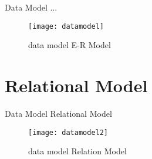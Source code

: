 \documentclass[10pt]{article}         %
\begin{document}
Data Model ...
\begin{figure}[h]
     \texttt{[image: datamodel]}
     \caption{data model E-R Model}
\end{figure}

\section{Relational Model}
Data Model  Relational Model

 \begin{figure}[h]
     \texttt{[image: datamodel2]}
     \caption{data model Relation Model}
\end{figure}
\end{document}
